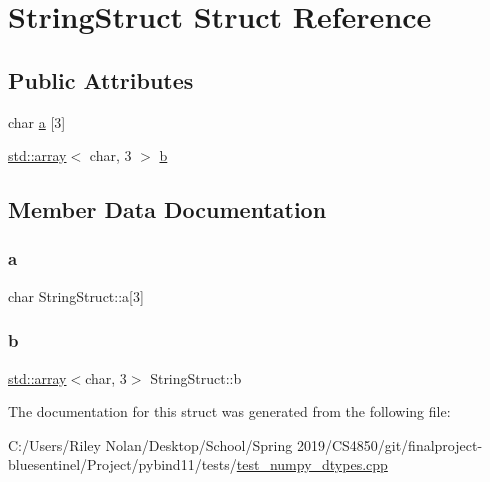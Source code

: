 \hypertarget{struct_string_struct}{}\section{String\+Struct Struct Reference}
\label{struct_string_struct}
\subsection*{Public Attributes}
\begin{DoxyCompactItemize}
\item 
char \mbox{\hyperlink{struct_string_struct_a1ecf17909530f71a928e395c0ea022af}{a}} \mbox{[}3\mbox{]}
\item 
\mbox{\hyperlink{_s_d_l__opengl__glext_8h_a52f38e7d822a46377fde7a02708eedb1}{std\+::array}}$<$ char, 3 $>$ \mbox{\hyperlink{struct_string_struct_a7cdc71f287687e641ae043919f70ab1b}{b}}
\end{DoxyCompactItemize}


\subsection{Member Data Documentation}
\mbox{\label{struct_string_struct_a1ecf17909530f71a928e395c0ea022af}} 
\subsubsection{\texorpdfstring{a}{a}}
{\footnotesize\ttfamily char String\+Struct\+::a\mbox{[}3\mbox{]}}

\mbox{\label{struct_string_struct_a7cdc71f287687e641ae043919f70ab1b}} 
\subsubsection{\texorpdfstring{b}{b}}
{\footnotesize\ttfamily \mbox{\hyperlink{_s_d_l__opengl__glext_8h_a52f38e7d822a46377fde7a02708eedb1}{std\+::array}}$<$char, 3$>$ String\+Struct\+::b}



The documentation for this struct was generated from the following file\+:\begin{DoxyCompactItemize}
\item 
C\+:/\+Users/\+Riley Nolan/\+Desktop/\+School/\+Spring 2019/\+C\+S4850/git/finalproject-\/bluesentinel/\+Project/pybind11/tests/\mbox{\hyperlink{test__numpy__dtypes_8cpp}{test\+\_\+numpy\+\_\+dtypes.\+cpp}}\end{DoxyCompactItemize}

